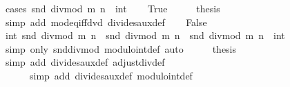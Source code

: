 \begin{isabellebody}
%
\isadelimproof
%
\endisadelimproof
%
\isatagproof
{}\isamarkupfalse%
\ {\isacharparenleft}{\kern0pt}cases\ {\isachardoublequoteopen}snd\ {\isacharparenleft}{\kern0pt}divmod\ m\ n{\isacharparenright}{\kern0pt}\ {\isacharequal}{\kern0pt}\ {\isacharparenleft}{\kern0pt}{}{\isacharcolon}{\kern0pt}{\isacharcolon}{\kern0pt}int{\isacharparenright}{\kern0pt}{\isachardoublequoteclose}{\isacharparenright}{\kern0pt}\isanewline
\ \ \isamarkupfalse%
\ True\isanewline
\ \ \isamarkupfalse%
\ \isamarkupfalse%
\ {\isacharquery}{\kern0pt}thesis\isanewline
\ \ \ \ \isamarkupfalse%
\ {\isacharparenleft}{\kern0pt}simp\ add{\isacharcolon}{\kern0pt}\ mod{\isacharunderscore}{\kern0pt}eq{\isacharunderscore}{\kern0pt}{}{\isacharunderscore}{\kern0pt}iff{\isacharunderscore}{\kern0pt}dvd\ divides{\isacharunderscore}{\kern0pt}aux{\isacharunderscore}{\kern0pt}def{\isacharparenright}{\kern0pt}\isanewline
{}\isamarkupfalse%
\isanewline
\ \ \isamarkupfalse%
\ False\isanewline
\ \ \isamarkupfalse%
\ \isamarkupfalse%
\ {\isachardoublequoteopen}int\ {\isacharparenleft}{\kern0pt}snd\ {\isacharparenleft}{\kern0pt}divmod\ m\ n{\isacharparenright}{\kern0pt}{\isacharparenright}{\kern0pt}\ {\isacharequal}{\kern0pt}\ snd\ {\isacharparenleft}{\kern0pt}divmod\ m\ n{\isacharparenright}{\kern0pt}{\isachardoublequoteclose}\ \ {\isachardoublequoteopen}snd\ {\isacharparenleft}{\kern0pt}divmod\ m\ n{\isacharparenright}{\kern0pt}\ {\isasymnoteq}\ {\isacharparenleft}{\kern0pt}{}{\isacharcolon}{\kern0pt}{\isacharcolon}{\kern0pt}int{\isacharparenright}{\kern0pt}{\isachardoublequoteclose}\isanewline
\ \ \ \ \isamarkupfalse%
\ {\isacharparenleft}{\kern0pt}simp\ only{\isacharcolon}{\kern0pt}\ snd{\isacharunderscore}{\kern0pt}divmod\ modulo{\isacharunderscore}{\kern0pt}int{\isacharunderscore}{\kern0pt}def{\isacharparenright}{\kern0pt}\ auto\isanewline
\ \ \isamarkupfalse%
\ \isamarkupfalse%
\ {\isacharquery}{\kern0pt}thesis\isanewline
\ \ \ \ \isamarkupfalse%
\ {\isacharparenleft}{\kern0pt}simp\ add{\isacharcolon}{\kern0pt}\ divides{\isacharunderscore}{\kern0pt}aux{\isacharunderscore}{\kern0pt}def\ adjust{\isacharunderscore}{\kern0pt}div{\isacharunderscore}{\kern0pt}def{\isacharparenright}{\kern0pt}\isanewline
\ \ \ \ \ \ {\isacharparenleft}{\kern0pt}simp\ add{\isacharcolon}{\kern0pt}\ divides{\isacharunderscore}{\kern0pt}aux{\isacharunderscore}{\kern0pt}def\ modulo{\isacharunderscore}{\kern0pt}int{\isacharunderscore}{\kern0pt}def{\isacharparenright}{\kern0pt}\isanewline

\end{isabellebody}
